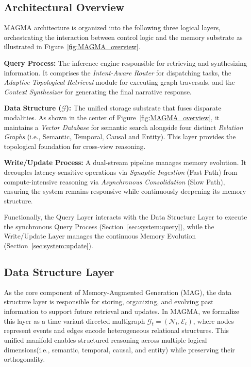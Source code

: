 \documentclass[11pt]{article}
\begin{document}
\subsection{Architectural Overview}
\label{sec:system:overview}

MAGMA architecture is organized into the following three logical layers, orchestrating the interaction between control logic and the memory substrate as illustrated in Figure~\ref{fig:MAGMA_overview}.

\noindent \textbf{Query Process:} The inference engine responsible for retrieving and synthesizing information. It comprises the \textit{Intent-Aware Router} for dispatching tasks, the \textit{Adaptive Topological Retrieval} module for executing graph traversals, and the \textit{Context Synthesizer} for generating the final narrative response.
    
\noindent \textbf{Data Structure ($\mathcal{G}$):} The unified storage substrate that fuses disparate modalities. As shown in the center of Figure~\ref{fig:MAGMA_overview}, it maintains a \textit{Vector Database} for semantic search alongside four distinct \textit{Relation Graphs} (i.e., Semantic, Temporal, Causal and Entity). This layer provides the topological foundation for cross-view reasoning.

\noindent  \textbf{Write/Update Process:} A dual-stream pipeline manages memory evolution. It decouples latency-sensitive operations via \textit{Synaptic Ingestion} (Fast Path) from compute-intensive reasoning via \textit{Asynchronous Consolidation} (Slow Path), ensuring the system remains responsive while continuously deepening its memory structure.

Functionally, the Query Layer interacts with the Data Structure Layer to execute the synchronous Query Process (Section~\ref{sec:system:query}), while the Write/Update Layer manages the continuous Memory Evolution (Section~\ref{sec:system:update}).



\subsection{Data Structure Layer}
\label{sec:system:topology}
As the core component of Memory-Augmented Generation (MAG), the data structure layer is responsible for storing, organizing, and evolving past information to support future retrieval and updates. In MAGMA, we formalize this layer as a time-variant directed multigraph $\mathcal{G}_t = (\mathcal{N}_t, \mathcal{E}_t)$, where nodes represent events and edges encode heterogeneous relational structures. This unified manifold enables structured reasoning across multiple logical dimensions(i.e., semantic, temporal, causal, and entity) while preserving their orthogonality.
\end{document}
